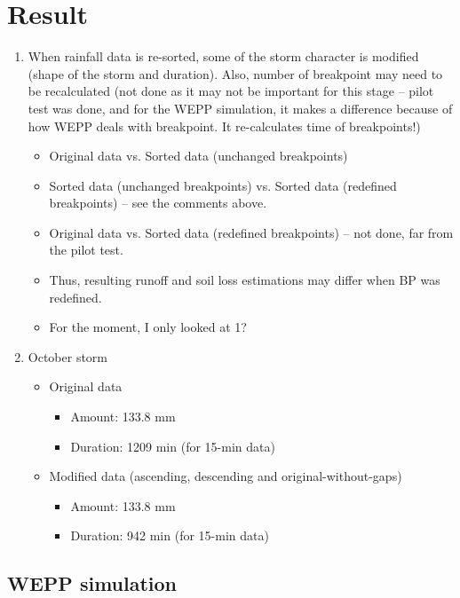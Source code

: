 \section{Result}
\label{sec:SimulationResult}

\begin{enumerate}
  \item When rainfall data is re-sorted, some of the storm character is modified
(shape of the storm and duration). Also, number of breakpoint may need to be
recalculated (not done as it may not be important for this stage -- pilot test
was done, and for the WEPP simulation, it makes a difference because of how WEPP
deals with breakpoint. It re-calculates time of breakpoints!)
    \begin{itemize}
      \item Original data vs. Sorted data (unchanged breakpoints)
      \item Sorted data (unchanged breakpoints) vs. Sorted data (redefined
breakpoints) -- see the comments above.
      \item Original data vs. Sorted data (redefined breakpoints) -- not done,
far from the pilot test.
      \item Thus, resulting runoff and soil loss estimations may differ when BP
was redefined.
      \item For the moment, I only looked at 1? %
    \end{itemize}
  \item October storm
    \begin{itemize}
      \item Original data
        \begin{itemize}
          \item Amount: 133.8 mm
          \item Duration: 1209 min (for 15-min data)
        \end{itemize}
      \item Modified data (ascending, descending and original-without-gaps)
        \begin{itemize}
          \item Amount: 133.8 mm
          \item Duration: 942 min (for 15-min data)
        \end{itemize}
    \end{itemize}
\end{enumerate}

\subsection{WEPP simulation}
\label{sec:WEPPSimulation}


